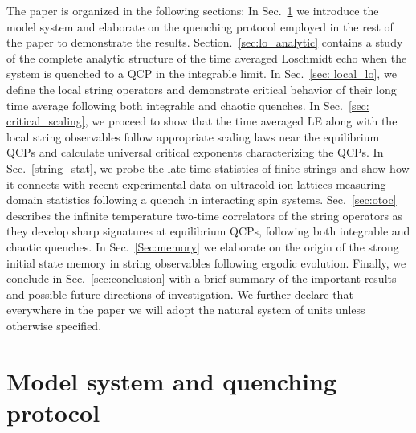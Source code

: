 \documentclass[aps,prx,twocolumn]{revtex4-2}
\begin{document}
The paper is organized in the following sections: In Sec.~\ref{sec:model} we introduce the  model system and elaborate on the quenching protocol employed in the rest of the paper to demonstrate the results. Section.~\ref{sec:lo_analytic} contains a study of the complete analytic structure of the time averaged Loschmidt echo when the system is quenched to a QCP in the integrable limit. In Sec.~\ref{sec: local_lo},  we define the local string operators and demonstrate critical behavior of their long time average following both integrable and chaotic quenches. In Sec.~\ref{sec: critical_scaling}, we proceed to show that the time averaged LE along with the local string observables follow appropriate scaling laws near the equilibrium QCPs and calculate universal critical exponents characterizing the QCPs. In Sec.~\ref{string_stat},  we probe the late time statistics of finite strings and show how it connects with recent experimental data on ultracold ion lattices measuring domain statistics following a quench in interacting spin systems. Sec.~\ref{sec:otoc} describes the infinite temperature two-time correlators of the string operators as they develop sharp signatures at equilibrium QCPs, following both integrable and chaotic quenches. In Sec.~\ref{Sec:memory} we elaborate on the origin of the strong initial state memory in string observables following ergodic evolution. Finally, we conclude in Sec.~\ref{sec:conclusion} with a brief summary of the important results and possible future directions of investigation. We further declare that everywhere in the paper we will adopt the natural system of units unless otherwise specified.



\section{Model system and quenching protocol}
\label{sec:model}
\end{document}
